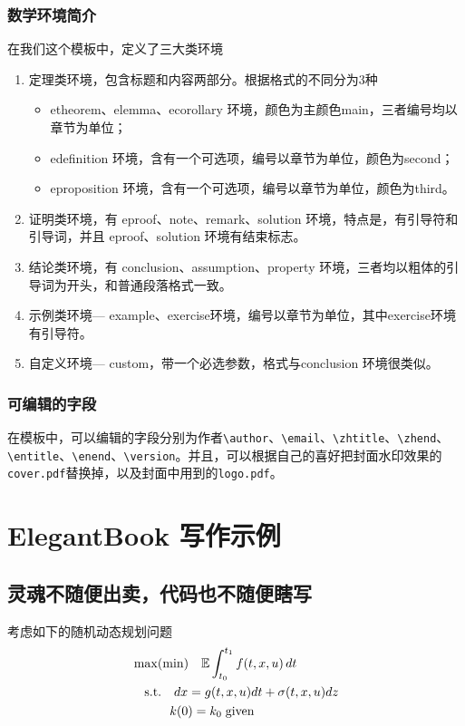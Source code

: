 \documentclass[mathpazo,titlestyle=hang,11pt]{elegantbook}
\begin{document}
\subsection{数学环境简介}
在我们这个模板中，定义了三大类环境
\begin{enumerate}
\item 定理类环境，包含标题和内容两部分。根据格式的不同分为3种
\begin{itemize}
\item {\color{main} etheorem、elemma、ecorollary} 环境，颜色为主颜色main，三者编号均以章节为单位；
\item {\color{main} edefinition} 环境，含有一个可选项，编号以章节为单位，颜色为second；
\item {\color{main} eproposition} 环境，含有一个可选项，编号以章节为单位，颜色为third。
\end{itemize}
\item 证明类环境，有  {\color{main} eproof、note、remark、solution} 环境，特点是，有引导符和引导词，并且 eproof、solution 环境有结束标志。
\item 结论类环境，有 {\color{main}  conclusion、assumption、property} 环境，三者均以粗体的引导词为开头，和普通段落格式一致。
\item 示例类环境--- {\color{main} example、exercise}环境，编号以章节为单位，其中exercise环境有引导符。
\item 自定义环境--- {\color{main} custom}，带一个必选参数，格式与conclusion 环境很类似。
\end{enumerate}

\subsection{可编辑的字段}
在模板中，可以编辑的字段分别为作者\verb|\author|、\verb|\email|、\verb|\zhtitle|、\verb|\zhend|、\verb|\entitle|、\verb|\enend|、\verb|\version|。并且，可以根据自己的喜好把封面水印效果的\verb|cover.pdf|替换掉，以及封面中用到的\verb|logo.pdf|。

\chapter{ElegantBook 写作示例}

\section{灵魂不随便出卖，代码也不随便瞎写}
\lipsum[3]
考虑如下的随机动态规划问题
\begin{align*}
&\max(\min)\quad \mathbb{E}\int_{t_0}^{t_1}f(t,x,u)\,dt\\
&\quad\mbox{s.t.} \quad dx=g(t,x,u)dt+\sigma(t,x,u)dz\\
&\quad \hspace{2.em} k(0)=k_0\;\text{given}
\end{align*}
\end{document}
